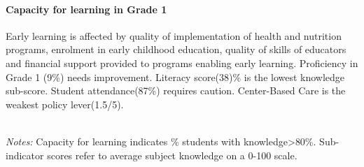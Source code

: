 \documentclass[
  twocolumn]{article}
\begin{document}
\hypertarget{capacity-for-learning-in-grade-1}{%
\paragraph{\texorpdfstring{\textbf{Capacity for learning in Grade
1}}{Capacity for learning in Grade 1}}\label{capacity-for-learning-in-grade-1}}

Early learning is affected by quality of implementation of health and
nutrition programs, enrolment in early childhood education, quality of
skills of educators and financial support provided to programs enabling
early learning. Proficiency in Grade 1 (9\%) needs improvement. Literacy
score(38)\% is the lowest knowledge sub-score. Student attendance(87\%)
requires caution. Center-Based Care is the weakest policy lever(1.5/5).

\begin{table}[H]
\\
\color{darkgray}\scriptsize{\textit{Notes:} Capacity for learning indicates \% students with knowledge\textgreater{80\%}. Sub-indicator scores refer to average subject knowledge on a 0-100 scale.}
\end{table}
\raggedbottom
\end{document}
